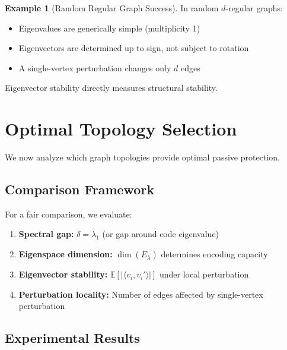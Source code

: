 \documentclass[11pt,a4paper]{article}
\theoremstyle{definition}
\newtheorem{example}[theorem]{Example}
\newcommand{\E}{\mathbb{E}}
\begin{document}
\begin{example}[Random Regular Graph Success]
In random $d$-regular graphs:
\begin{itemize}[noitemsep]
    \item Eigenvalues are generically simple (multiplicity 1)
    \item Eigenvectors are determined up to sign, not subject to rotation
    \item A single-vertex perturbation changes only $d$ edges
\end{itemize}
Eigenvector stability directly measures structural stability.
\end{example}

\section{Optimal Topology Selection}
\label{sec:topology}

We now analyze which graph topologies provide optimal passive protection.

\subsection{Comparison Framework}

For a fair comparison, we evaluate:
\begin{enumerate}[noitemsep]
    \item \textbf{Spectral gap:} $\delta = \lambda_1$ (or gap around code eigenvalue)
    \item \textbf{Eigenspace dimension:} $\dim(E_\lambda)$ determines encoding capacity
    \item \textbf{Eigenvector stability:} $\E[|\langle v_i, v_i'\rangle|]$ under local perturbation
    \item \textbf{Perturbation locality:} Number of edges affected by single-vertex perturbation
\end{enumerate}

\subsection{Experimental Results}
\end{document}
